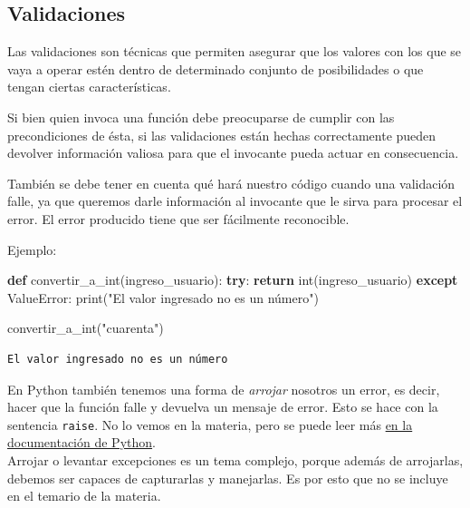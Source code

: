 \documentclass[
  letterpaper,
  DIV=11,
  numbers=noendperiod]{scrreprt}
\newenvironment{Shaded}{\begin{snugshade}}{\end{snugshade}}
\newcommand{\BuiltInTok}[1]{\textcolor[rgb]{0.00,0.23,0.31}{#1}}
\newcommand{\ControlFlowTok}[1]{\textcolor[rgb]{0.00,0.23,0.31}{\textbf{#1}}}
\newcommand{\KeywordTok}[1]{\textcolor[rgb]{0.00,0.23,0.31}{\textbf{#1}}}
\newcommand{\NormalTok}[1]{\textcolor[rgb]{0.00,0.23,0.31}{#1}}
\newcommand{\PreprocessorTok}[1]{\textcolor[rgb]{0.68,0.00,0.00}{#1}}
\newcommand{\StringTok}[1]{\textcolor[rgb]{0.13,0.47,0.30}{#1}}
\begin{document}
\subsection{Validaciones}\label{validaciones}

Las validaciones son técnicas que permiten asegurar que los valores con
los que se vaya a operar estén dentro de determinado conjunto de
posibilidades o que tengan ciertas características.

Si bien quien invoca una función debe preocuparse de cumplir con las
precondiciones de ésta, si las validaciones están hechas correctamente
pueden devolver información valiosa para que el invocante pueda actuar
en consecuencia.

También se debe tener en cuenta qué hará nuestro código cuando una
validación falle, ya que queremos darle información al invocante que le
sirva para procesar el error. El error producido tiene que ser
fácilmente reconocible.

Ejemplo:

\begin{Shaded}
\begin{Highlighting}[]
\KeywordTok{def}\NormalTok{ convertir\_a\_int(ingreso\_usuario):}
  \ControlFlowTok{try}\NormalTok{:}
    \ControlFlowTok{return} \BuiltInTok{int}\NormalTok{(ingreso\_usuario)}
  \ControlFlowTok{except} \PreprocessorTok{ValueError}\NormalTok{:}
    \BuiltInTok{print}\NormalTok{(}\StringTok{"El valor ingresado no es un número"}\NormalTok{)}

\NormalTok{convertir\_a\_int(}\StringTok{"cuarenta"}\NormalTok{)}
\end{Highlighting}
\end{Shaded}

\begin{verbatim}
El valor ingresado no es un número
\end{verbatim}

\begin{tcolorbox}[enhanced jigsaw, arc=.35mm, toptitle=1mm, colframe=quarto-callout-note-color-frame, bottomtitle=1mm, opacitybacktitle=0.6, colbacktitle=quarto-callout-note-color!10!white, leftrule=.75mm, coltitle=black, toprule=.15mm, titlerule=0mm, title=\textcolor{quarto-callout-note-color}{\faInfo}\hspace{0.5em}{Note}, bottomrule=.15mm, rightrule=.15mm, colback=white, breakable, opacityback=0, left=2mm]

En Python también tenemos una forma de \emph{arrojar} nosotros un error,
es decir, hacer que la función falle y devuelva un mensaje de error.
Esto se hace con la sentencia \texttt{raise}. No lo vemos en la materia,
pero se puede leer más
\href{https://docs.python.org/es/3/c-api/exceptions.html\#raising-exceptions}{en
la documentación de Python}.\\
Arrojar o levantar excepciones es un tema complejo, porque además de
arrojarlas, debemos ser capaces de capturarlas y manejarlas. Es por esto
que no se incluye en el temario de la materia.

\end{tcolorbox}
\end{document}
